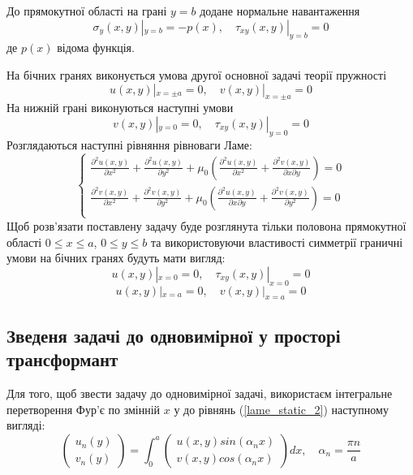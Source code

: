 До прямокутної області на грані $y=b$ додане нормальне навантаження
\begin{equation}
    \sigma_y(x, y) |_{y=b} = -p(x), \quad  \tau_{xy}(x,y) |_{y=b} =0
\end{equation}
де $p(x)$ відома функція.

На бічних гранях виконується умова другої основної задачі теорії пружності
\begin{equation}
    u(x,y) |_{x=\pm a} = 0, \quad v(x,y) |_{x=\pm a} =0
\end{equation}
На нижній грані виконуються наступні умови
\begin{equation}
    v(x,y) |_{y=0} = 0, \quad \tau_{xy}(x,y) |_{y=0} =0
\end{equation}
Розглядаються наступні рівняння рівноваги Ламе:
\begin{equation}\label{lame_static_2}
    \begin{cases}
        \frac{\partial^2 u(x,y)}{\partial x^2} + \frac{\partial^2 u(x,y)}{\partial y^2} + \mu_0 (\frac{\partial^2 u(x,y)}{\partial x^2} + \frac{\partial^2 v(x,y)}{\partial x\partial y}) = 0 \\
        \frac{\partial^2 v(x,y)}{\partial x^2} + \frac{\partial^2 v(x,y)}{\partial y^2} + \mu_0 (\frac{\partial^2 u(x,y)}{\partial x \partial y} + \frac{\partial^2 v(x,y)}{\partial y^2}) = 0 \\
    \end{cases}
\end{equation}
Щоб розв'язати поставлену задачу буде розглянута тільки половона прямокутної області $0 \le x \le a$, $0 \le y \le b$
та використовуючи властивості симметрії граничні умови на бічних гранях будуть мати вигляд:
\begin{equation}\label{bound_1_static_2}
    u(x,y) |_{x=0} = 0, \quad \tau_{xy}(x,y) |_{x=0} =0
\end{equation}
\begin{equation}\label{bound_2_static_2}
    u(x,y) |_{x=a} = 0, \quad v(x,y) |_{x=a} = 0
\end{equation}

\subsection{Зведеня задачі до одновимірної у просторі трансформант}
Для того, щоб звести задачу до одновимірної задачі, використаєм інтегральне перетворення Фур'є по змінній $x$ у до рівнянь (\ref{lame_static_2}) наступному вигляді:
\begin{equation}
    \begin{pmatrix}
        u_n(y) \\
        v_n(y)
    \end{pmatrix} = \int_{0}^{a} 
    \begin{pmatrix}
        u(x,y) sin(\alpha_n x) \\
        v(x,y) cos(\alpha_n x)
    \end{pmatrix} dx, \quad \alpha_n = \frac{\pi n}{a}
\end{equation}

